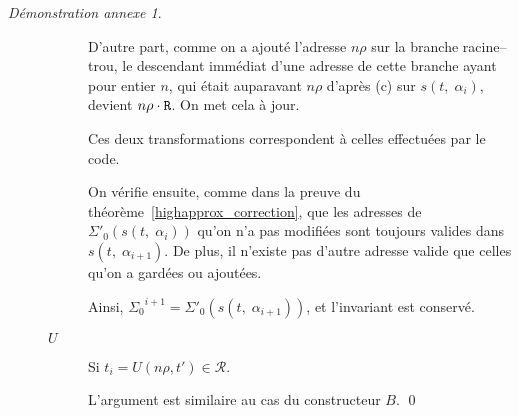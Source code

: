 \documentclass[11pt,a4paper]{article}
\theoremstyle{plain}
\theoremstyle{definition}
\theoremstyle{remark}
\newtheorem{demonstrationappendix}{Démonstration annexe}
\newcommand*{\Right}{\textnormal{\texttt{R}}}
\newcommand*{\representations}{\ensuremath{\mathcal{R}}}
\newcommand*{\lowapprox}{\ensuremath{\Sigma_0}}
\newcommand*{\lowapproxspec}{\ensuremath{\Sigma'_0}}
\newcommand*{\treesimplify}{\ensuremath{s}}
\newcommand*{\cdespartial}{(c)}
\begin{document}
\begin{demonstrationappendix}
\begin{description}
\begin{description}
            D'autre part, comme on a ajouté l'adresse $n\rho$ sur la branche racine--trou, le descendant immédiat d'une adresse de cette branche ayant pour entier $n$, qui était auparavant $n\rho$ d'après \cdespartial{} sur $\treesimplify( t, \; {\alpha}_{i} )$, devient $n\rho \cdot \Right$. On met cela à jour.

            Ces deux transformations correspondent à celles effectuées par le code.

            On vérifie ensuite, comme dans la preuve du théorème~\ref{highapprox_correction}, que les adresses de $\lowapproxspec \left( \treesimplify( t, \; {\alpha}_{i} ) \right)$ qu'on n'a pas modifiées sont toujours valides dans $\treesimplify( t, \; {\alpha}_{i+1} )$. De plus, il n'existe pas d'autre adresse valide que celles qu'on a gardées ou ajoutées.

            Ainsi, $\lowapprox^{i+1} = \lowapproxspec \left( \treesimplify( t, \; {\alpha}_{i+1} ) \right)$, et l'invariant est conservé.

            \item[$U$] Si $t_i = U(n\rho, t') \in \representations$.

            L'argument est similaire au cas du constructeur $B$.
\qed
        \end{description}
    \end{description}
\end{demonstrationappendix}
\end{document}
